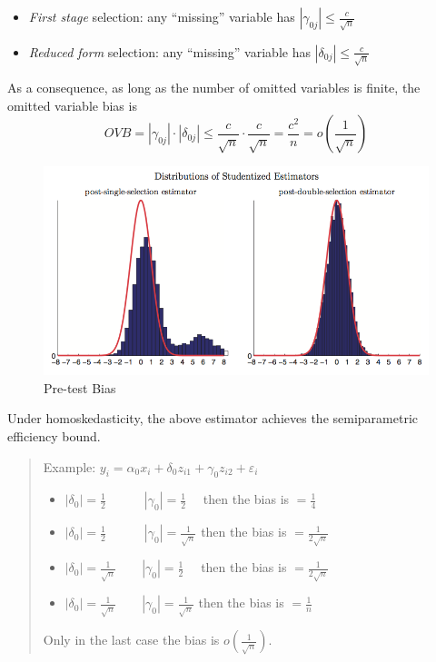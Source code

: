 \documentclass[12pt,]{book}
\providecommand{\tightlist}{%
  \setlength{\itemsep}{0pt}\setlength{\parskip}{0pt}}
\begin{document}
\begin{itemize}
\tightlist
\item
  \emph{First stage} selection: any ``missing'' variable has \(|\gamma_{0j}| \leq \frac{c}{\sqrt{n}}\)
\item
  \emph{Reduced form} selection: any ``missing'' variable has \(|\delta_{0j}| \leq \frac{c}{\sqrt{n}}\)
\end{itemize}

As a consequence, as long as the number of omitted variables is finite, the omitted variable bias is
\[
    OVB = |\gamma_{0j}| \cdot|\delta_{0j}| \leq \frac{c}{\sqrt{n}} \cdot \frac{c}{\sqrt{n}} = \frac{c^2}{n} = o \left(\frac{1}{\sqrt{n}}\right)
\]

\begin{figure}
\centering
\includegraphics{figures/Fig_641.png}
\caption{Pre-test Bias}
\end{figure}

Under homoskedasticity, the above estimator achieves the semiparametric efficiency bound.

\begin{quote}
Example: \(y_i = \alpha_0 x_i + \delta_0 z_{i1} + \gamma_0 z_{i2} + \varepsilon_i\)

\begin{itemize}
\tightlist
\item
  \(| \delta_0 | = \frac{1}{2} \qquad \quad | \gamma_0| = \frac{1}{2} \quad\) then the bias is \(= \frac{1}{4}\)
\item
  \(| \delta_0 | = \frac{1}{2} \qquad \quad | \gamma_0| = \frac{1}{\sqrt{n}}\) then the bias is \(= \frac{1}{2 \sqrt{n}}\)
\item
  \(| \delta_0 | = \frac{1}{\sqrt{n}} \qquad | \gamma_0| = \frac{1}{2}\quad\) then the bias is \(= \frac{1}{2 \sqrt{n}}\)
\item
  \(| \delta_0 | = \frac{1}{\sqrt{n}} \qquad | \gamma_0| = \frac{1}{\sqrt{n}}\) then the bias is \(= \frac{1}{n}\)
\end{itemize}

Only in the last case the bias is \(o \left(\frac{1}{\sqrt{n}}\right)\).
\end{quote}
\end{document}
